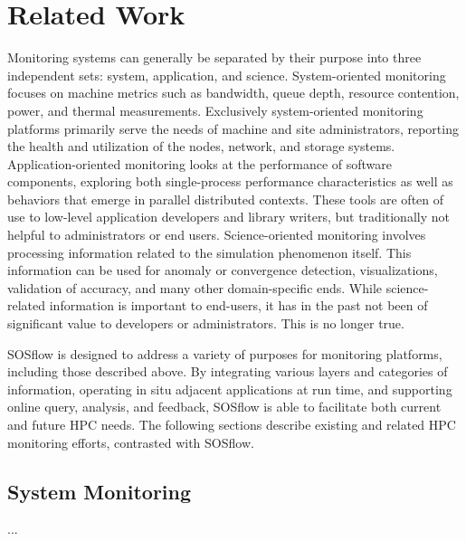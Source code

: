 
\section{Related Work}
%
Monitoring systems can generally be separated by their purpose into three
independent sets: system, application, and science.
%
System-oriented monitoring focuses on machine metrics such as bandwidth,
queue depth, resource contention, power, and thermal measurements.
%
Exclusively system-oriented monitoring platforms primarily serve the
needs of machine and site administrators, reporting the health and utilization
of the nodes, network, and storage systems.
%
Application-oriented monitoring looks at the performance of software components,
exploring both single-process performance characteristics as well as behaviors
that emerge in parallel distributed contexts.
%
These tools are often of use to low-level application developers and library
writers, but traditionally not helpful to administrators or end users.
%
Science-oriented monitoring involves processing information related to the
simulation phenomenon itself.
%
This information can be used for anomaly or convergence detection,
visualizations, validation of accuracy, and many other domain-specific ends.
%
While science-related information is important to end-users, it has in the
past not been of significant value to developers or administrators.
%
This is no longer true.
%
\par
{}
\par
%
%
SOSflow is designed to address a variety of purposes for monitoring platforms,
including those described above.
%
By integrating various layers and categories of information, operating in
situ adjacent applications at run time, and supporting online query,
analysis, and feedback, SOSflow is able to facilitate both current and
future HPC needs.
%
The following sections describe existing and related HPC monitoring efforts,
contrasted with SOSflow.
%
\subsection{System Monitoring}
%
...
%
